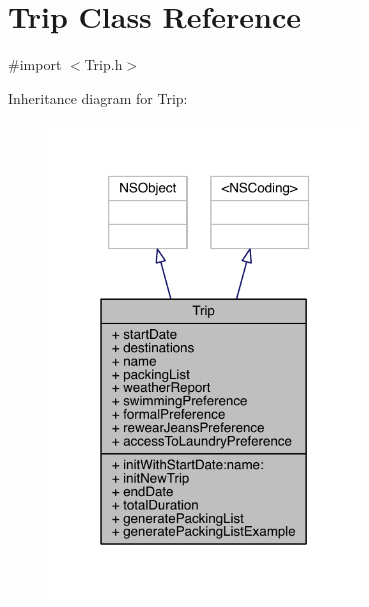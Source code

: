 \hypertarget{interface_trip}{\section{Trip Class Reference}
\label{interface_trip}
}


{\ttfamily \#import $<$Trip.\-h$>$}



Inheritance diagram for Trip\-:\nopagebreak
\begin{figure}[H]
\begin{center}
\leavevmode
\includegraphics[width=235pt]{interface_trip__inherit__graph}
\end{center}
\end{figure}


